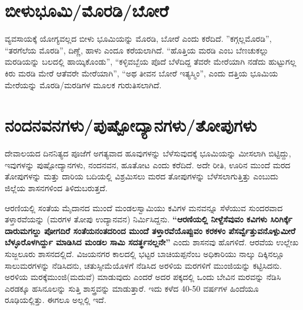 \newpage

\section*{ಬೀಳುಭೂಮಿ/ಮೊರಡಿ/ಬೋರೆ}

ವ್ಯವಸಾಯಕ್ಕೆ ಯೋಗ್ಯವಲ್ಲದ ಬೀಳು ಭೂಮಿಯನ್ನು ಮೊರಡಿ, ಬೋರೆ ಎಂದು ಕರೆದಿದೆ. ”ಕಗ್ಗಲ್ಲಮೊರಡಿ”, “ತರಗೆಲೆಯ ಮೊರಡಿ”, ದಿಣ್ಣೆ, ಹಾಳು ಎಂದೂ ಕರೆಯಲಾಗಿದೆ. “ಹೊತ್ತಿಯ ಮರಡಿ ಎಂಬ ಬೆಣಚುಕಲ್ಲು ಮರಡಿಯನ್ನು ಬಲದಲ್ಲಿ ಹಾಯ್ಕಿಕೊಂಡು”, “ಕಳ್ಳಿವಬ್ಬೆಯ ಪೊದೆ ಬೆಳೆದಿದ್ದ ತೆವರೇ ಮೇರೆಯಾಗಿ ನಡೆದು ಹುಟ್ಟುಗಲ್ಲ ಕಿರು ಮರಡಿ ಮೇರೆ ಆ\break ತೆವರೇ ಮೇರೆಯಾಗಿ”, “ಅಥ ತೀವನ ಬೋರೆ ಇತ್ಯಸ್ಮಿಂ”, ಎಂದು ದತ್ತಿಯ ಭೂಮಿಯ ಮೇರೆಯನ್ನು \hbox{ಮೊರಡಿ}/ಮರಡಿಗಳ ಮೂಲಕ ಗುರುತಿಸಲಾಗಿದೆ.


\section*{ನಂದನವನಗಳು/ಪುಷ್ಪೋದ್ಯಾನಗಳು/ತೋಪುಗಳು}

ದೇವಾಲಯದ ದಿನನಿತ್ಯದ ಪೂಜೆಗೆ ಅಗತ್ಯವಾದ ಹೂವುಗಳನ್ನು ಬೆಳೆಸುವುದಕ್ಕೆ ಭೂಮಿಯನ್ನು ಮೀಸಲಾಗಿ ಬಿಟ್ಟಿದ್ದು, ಇವುಗಳನ್ನು ಪುಷ್ಪೋದ್ಯಾನಗಳು, ನಂದನವನ, ಹೂತೋಟ ಎಂದು ಕರೆದಿದೆ. ಅದೇ ರೀತಿ, ಊರಿನ ಮುಂದೆ ಮರದ ತೋಪು\-ಗಳನ್ನು ಮತ್ತು ದಾರಿಯ ಬದಿಯಲ್ಲಿ ವಿಶ್ರಮಿಸಲು ಮರದ ತೋಪುಗಳನ್ನು ಬೆಳೆಸಲಾಗುತ್ತಿತ್ತು ಎಂಬುದು ಜಿಲ್ಲೆಯ ಶಾಸನಗಳಿಂದ ತಿಳಿದುಬರುತ್ತದೆ.

ಆರಣಿಯಲ್ಲಿ ಸಂತೆಯ ಮೈದಾನದ ಮುಂದೆ ಮಂಡಲಸ್ವಾಮಿಯು ಕವಿಗಳ ಮನವನ್ನೂ ಸೆಳೆಯುವ ಸುಂದರವಾದ ತಳ್ತಾರವೆಯನ್ನು (ಮರಗಳ ತೋಪು ಉದ್ಯಾನವನ) ನಿರ್ಮಿಸಿದ್ದನು. \textbf{“ಆರಣಿಯಲ್ಲಿ ನೀಳ್ದೆಸೆವುವಂ ಕವಿಗಳು ಸಿರಿಗಿರ್ಕ್ಕೆ ದಾರು\-ಮಗಲ್ದು ಪೋಗದಿರೆ ಸಂತೆಯನಂತದರಿಂದ ಮುಂದೆ ತಳ್ತಾರವೆಯೊಪ್ಪುವಂ ಕರಕಳಂ ಪೆಸರ್ವ್ವೆತ್ತುವನೊಳ್ಪುಮೀರೆ ಬೆಳ್ಳೂರೊಳ\-ಗಿರ್ದ್ದು ಮಾಡಿಸಿದ ಮಂಡಲ ಸಾಮಿ ಸದರ್ತ್ಥನಲ್ಲನೇ”} ಎಂದು ಶಾಸನವು ಹೊಗಳಿದೆ. ಆರವೆಯ ಉಲ್ಲೇಖ ಸುಜ್ಜಲೂರು ಶಾಸನದಲ್ಲಿದೆ. ವಿಜಯನಗರ ಕಾಲದಲ್ಲಿ ಭಟ್ಟರ ಬಾಚಿಯಪ್ಪನೆಂಬ ಅಧಿಕಾರಿಯು ನಾಲ್ಕು ದಿಕ್ಕಿನಲ್ಲೂ ಸಾಲುಮರ\-ಗಳನ್ನು ನೆಡಿಸಿದನು, ಚತುಸ್ಸೀಮೆಯೊಳಗೆ ನೆಡಿಸಿದ ಅರಳಿಯ ಮರ\-ಗಳಿಗೆ ಮುಂಜಿಯನ್ನು ಕಟ್ಟಿಸಿದನು. ಅರಳಿಯ ಮರಕ್ಕೆ\break ಮುಂಜಿ(ಮದುವೆ) ಮಾಡುವುದು ಎಂದರೆ ಅದರ ಪಕ್ಕದಲ್ಲಿ ಒಂದು ಬೇವಿನ ಮರವನ್ನು ನೆಡಿಸಿ ಎರಡಕ್ಕೂ ಹಸಿನೂಲನ್ನು ಸುತ್ತಿ ಶಾಸ್ತ್ರವನ್ನು ಮಾಡುತ್ತಾರೆ. ಇದು ಕಳೆದ 40-50 ವರ್ಷಗಳ ಹಿಂದೆಯೂ ರೂಢಿಯಲ್ಲಿತ್ತು. ಈಗಲೂ ಅಲ್ಲಲ್ಲಿ ಇದೆ.

